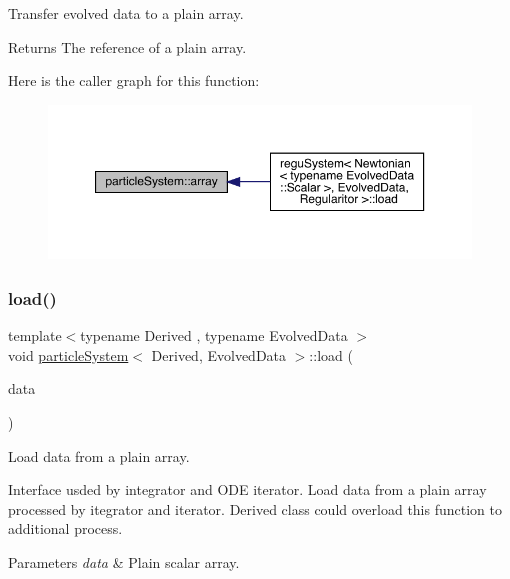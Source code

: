 Transfer evolved data to a plain array. 

\begin{DoxyReturn}{Returns}
The reference of a plain array. 
\end{DoxyReturn}
Here is the caller graph for this function\+:\nopagebreak
\begin{figure}[H]
\begin{center}
\leavevmode
\includegraphics[width=350pt]{classparticle_system_a1817956f802188c82c12c223c32bd28a_icgraph}
\end{center}
\end{figure}
\mbox{\label{classparticle_system_a73609eb9d95e01724f9f56cb0d9f7ac7}} 
\subsubsection{\texorpdfstring{load()}{load()}}
{\footnotesize\ttfamily template$<$typename Derived , typename Evolved\+Data $>$ \\
void \mbox{\hyperlink{classparticle_system}{particle\+System}}$<$ Derived, Evolved\+Data $>$\+::load (\begin{DoxyParamCaption}\item[{\mbox{\hyperlink{classparticle_system_ae5a7215810a9f2cad5508aca6b26a063}{Plain\+Array}} \&}]{data }\end{DoxyParamCaption})}



Load data from a plain array. 

Interface usded by integrator and O\+DE iterator. Load data from a plain array processed by itegrator and iterator. Derived class could overload this function to additional process.


\begin{DoxyParams}{Parameters}
{\em data} & Plain scalar array. \\
\hline
\end{DoxyParams}
\mbox{\label{classparticle_system_a95f991ac50fde37e7c57dd6feca1e358}} 
